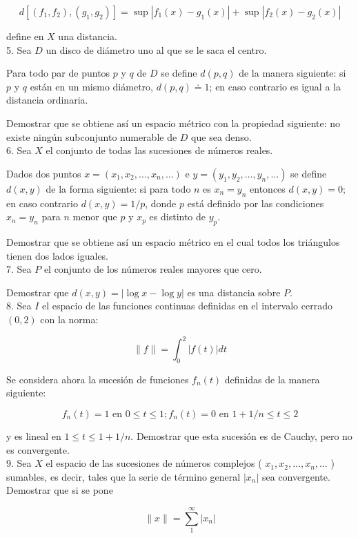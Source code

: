 \documentclass[10pt]{article}
\theoremstyle{plain}
\theoremstyle{definition}
\theoremstyle{remark}
\begin{document}
$$
d\left[\left(f_{1}, f_{2}\right),\left(g_{1}, g_{2}\right)\right]=\sup \left|f_{1}(x)-g_{1}(x)\right|+\sup \left|f_{2}(x)-g_{2}(x)\right|
$$

define en $X$ una distancia.\\
5. Sea $D$ un disco de diámetro uno al que se le saca el centro.

Para todo par de puntos $p$ y $q$ de $D$ se define $d(p, q)$ de la manera siguiente: si $p$ y $q$ están en un mismo diámetro, $d(p, q) \doteq 1$; en caso contrario es igual a la distancia ordinaria.

Demostrar que se obtiene así un espacio métrico con la propiedad siguiente: no existe ningún subconjunto numerable de $D$ que sea denso.\\
6. Sea $X$ el conjunto de todas las sucesiones de números reales.

Dados dos puntos $x=\left(x_{1}, x_{2}, \ldots, x_{n}, \ldots\right)$ e $y=\left(y_{1}, y_{2}, \ldots, y_{n}, \ldots\right)$ se define $d(x, y)$ de la forma siguiente: si para todo $n$ es $x_{n}=y_{n}$ entonces $d(x, y)=0$; en caso contrario $d(x, y)=1 / p$, donde $p$ está definido por las condiciones $x_{n}=y_{n}$ para $n$ menor que $p$ y $x_{p}$ es distinto de $y_{p}$.

Demostrar que se obtiene así un espacio métrico en el cual todos los triángulos tienen dos lados iguales.\\
7. Sea $P$ el conjunto de los números reales mayores que cero.

Demostrar que $d(x, y)=|\log x-\log y|$ es una distancia sobre $P$.\\
8. Sea $I$ el espacio de las funciones continuas definidas en el intervalo cerrado $(0,2)$ con la norma:

$$
\|f\|=\int_{0}^{2}|f(t)| d t
$$

Se considera ahora la sucesión de funciones $f_{n}(t)$ definidas de la manera siguiente:


$$
f_{n}(t)=1 \text { en } 0 \leqslant t \leqslant 1 ; f_{n}(t)=0 \text { en } 1+1 / n \leqslant t \leqslant 2
$$

y es lineal en $1 \leqslant t \leqslant 1+1 / n$. Demostrar que esta sucesión es de Cauchy, pero no es convergente.\\
9. Sea $X$ el espacio de las sucesiones de números complejos ( $x_{1}, x_{2}, \ldots, x_{n}, \ldots$ ) sumables, es decir, tales que la serie de término general $\left|x_{n}\right|$ sea convergente. Demostrar que si se pone

$$
\|x\|=\sum_{1}^{\infty}\left|x_{n}\right|
$$
\end{document}
